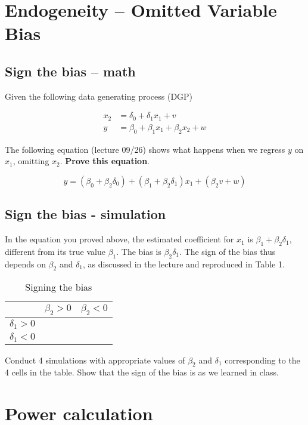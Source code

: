 \documentclass{article}\usepackage[]{graphicx}\usepackage[]{color}
\begin{document}
\section{Endogeneity -- Omitted Variable Bias}

\subsection{Sign the bias -- math}

Given the following data generating process (DGP)

\begin{align}
x_2 &= \delta_0 + \delta_1 x_1 + v \\
y &= \beta_0 + \beta_1 x_1 + \beta_2 x_2 + w
\end{align}

The following equation (lecture 09/26) shows what happens when we regress $y$ on $x_1$, omitting $x_2$. \textbf{Prove this equation}.

$$
y = (\beta_0 + \beta_2 \delta_0) + (\beta_1 + \beta_2 \delta_1) x_1 + (\beta_2 v + w)
$$


\subsection{Sign the bias - simulation}

In the equation you proved above, the estimated coefficient for $x_1$ is $\beta_1 + \beta_2 \delta_1$, different from its true value $\beta_1$. The bias is $\beta_2\delta_1$. The sign of the bias thus depends on $\beta_2$ and $\delta_1$, as discussed in the lecture and reproduced in Table 1.

\begin{table}[]
\centering
\caption{Signing the bias}
\label{my-label}
\begin{tabular}{|l|l|l|}
\hline
               & $\beta_2 > 0$ & $\beta_2 < 0$ \\ \hline
$\delta_1 > 0$ &               &               \\ \hline
$\delta_1 < 0$ &               &               \\ \hline
\end{tabular}
\end{table}

Conduct 4 simulations with appropriate values of $\beta_2$ and $\delta_1$ corresponding to the 4 cells in the table. Show that the sign of the bias is as we learned in class.

\section{Power calculation}
\end{document}
